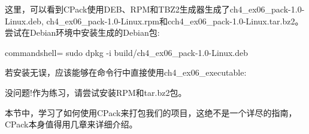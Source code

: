 这里，可以看到CPack使用DEB、RPM和TBZ2生成器生成了ch4\_ex06\_pack-1.0-Linux.deb, ch4\_ex06\_pack-1.0-Linux.rpm和cch4\_ex06\_pack-1.0-Linux.tar.bz2。尝试在Debian环境中安装生成的Debian包:

\begin{tcblisting}{commandshell={}}
sudo dpkg -i build/ch4_ex06_pack-1.0-Linux.deb
\end{tcblisting}

若安装无误，应该能够在命令行中直接使用ch4\_ex06\_executable:


没问题!作为练习，请尝试安装RPM和tar.bz2包。

本节中，学习了如何使用CPack来打包我们的项目，这绝不是一个详尽的指南，CPack本身值得用几章来详细介绍。








